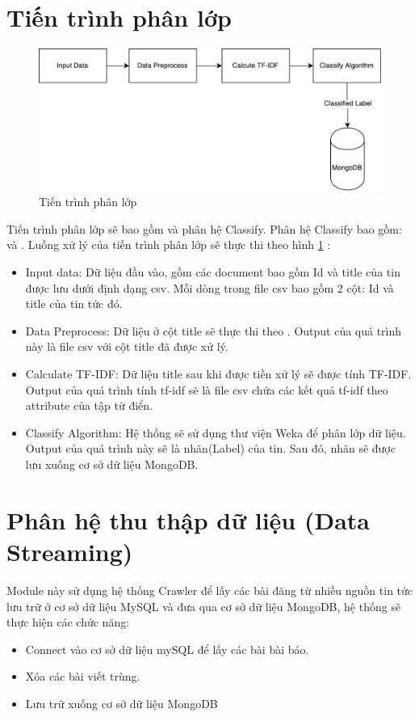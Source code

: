 \section{Tiến trình phân lớp}
\begin{figure}[H]
	\centering
	\includegraphics[width=0.9\linewidth]{Chapter3/Chapter3Figs/PDF/ClassifyProcess}
	\caption{Tiến trình phân lớp}
	\label{fig:classifyprocess}
\end{figure}
Tiến trình phân lớp sẽ bao gồm  và phân hệ Classify.
Phân hệ Classify bao gồm:  và .
Luồng xử lý của tiến trình phân lớp sẽ thực thi theo hình \ref{fig:classifyprocess} :
\begin{itemize}
	\item Input data: Dữ liệu đầu vào, gồm các document bao gồm Id và title của tin được lưu dưới định dạng csv. Mỗi dòng trong file csv bao gồm 2 cột: Id và title của tin tức đó.
	\item Data Preprocess: Dữ liệu ở cột title  sẽ thực thi theo . Output của quá trình này là file csv với cột title đã được xử lý.
	\item Calculate TF-IDF: Dữ liệu title sau khi được tiền xử lý sẽ được tính TF-IDF. Output của quá trình tính tf-idf sẽ là file csv chứa các kết quả tf-idf theo attribute của tập từ điển.
	\item Classify Algorithm: Hệ thống sẽ sử dụng thư viện Weka để phân lớp dữ liệu. Output của quá trình này sẽ là nhãn(Label) của tin. Sau đó, nhãn sẽ được lưu xuống cơ sở dữ liệu MongoDB.
\end{itemize}

\section{Phân hệ thu thập dữ liệu (Data Streaming)} \label{sec:DataStreaming}
Module này sử dụng hệ thống Crawler để lấy các bài đăng từ nhiều nguồn tin tức lưu trữ ở cơ sở dữ liệu MySQL và đưa qua cơ sở dữ liệu MongoDB, hệ thống sẽ thực hiện các chức năng:
	\begin{itemize}
		\item Connect vào cơ sở dữ liệu mySQL để lấy các bài bài báo.
		\item Xóa các bài viết trùng.
		\item Lưu trữ xuống cơ sở dữ liệu MongoDB
	\end{itemize}
